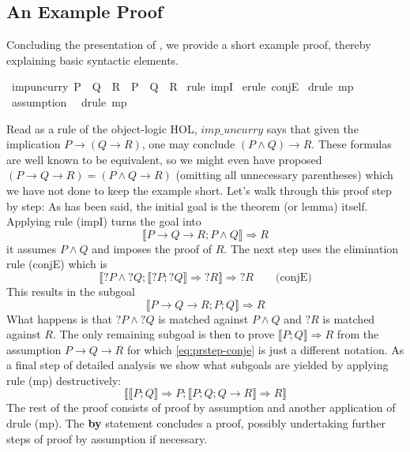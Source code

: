 \subsection{An Example Proof}
\label{sec:an-example-proof}

Concluding the presentation of \Isabelle, we provide a short example proof,
thereby explaining basic syntactic elements. 


\begin{isabellebody}%
\isanewline
\isamarkupfalse%
\ imp{\isacharunderscore}uncurry{\isacharcolon}\ {\isachardoublequote}P\ {\isasymlongrightarrow}\ {\isacharparenleft}Q\ {\isasymlongrightarrow}\ R{\isacharparenright}\ {\isasymLongrightarrow}\ {\isacharparenleft}P\ {\isasymand}\ Q{\isacharparenright}\ {\isasymlongrightarrow}\ R{\isachardoublequote}\isanewline
\isamarkupfalse%
\ {\isacharparenleft}rule\ impI{\isacharparenright}\isanewline
\isamarkupfalse%
\ {\isacharparenleft}erule\ conjE{\isacharparenright}\isanewline
\isamarkupfalse%
\ {\isacharparenleft}drule\ mp{\isacharparenright}\isanewline
\isamarkupfalse%
\ assumption\isanewline
\isamarkupfalse%
\ \ {\isacharparenleft}drule\ mp{\isacharparenright}\isanewline
\end{isabellebody}

Read as a rule of the object-logic HOL, $\mathit{imp\_uncurry}$ says that given
the implication $P \longrightarrow (Q \longrightarrow R)$, one may conclude $(P\land Q) \longrightarrow R$. These formulas are
well known to be equivalent, so we might even have proposed $(P \longrightarrow Q \longrightarrow R) = (P \land
Q \longrightarrow R)$ (omitting all unnecessary parentheses) which we have not done to keep
the example short. Let's walk through this proof
step by step: As has been said, the initial goal is the theorem (or lemma)
itself. Applying rule (impI) turns the goal into
\[
\llbracket P\longrightarrow Q\longrightarrow R; P\land Q\rrbracket \Longrightarrow R
\]
\IE it assumes $P\land Q$ and imposes the proof of $R$. The next step uses the
elimination rule (conjE) which is
\[
\llbracket{?P} \land {?Q}; \llbracket{?P}; {?Q}\rrbracket \Longrightarrow {?R}\rrbracket \Longrightarrow {?R}\qquad \text{(conjE)}
\]
This results in the subgoal
\begin{equation} \label{eq:prstep-conje}
\llbracket P\longrightarrow Q\longrightarrow R; P; Q\rrbracket \Longrightarrow R
\end{equation}
What happens is that ${?P} \land {?Q}$ is matched against $P \land Q$ and ${?R}$ is
matched against $R$. The only remaining subgoal is then to prove $\llbracket P; Q\rrbracket\Longrightarrow R$ from
the assumption $P\longrightarrow Q\longrightarrow R$ for which \eqref{eq:prstep-conje} is just a different
notation. As a final step of detailed analysis we show what subgoals are yielded
by applying rule (mp) destructively:
\[
\llbracket \llbracket P; Q\rrbracket \Longrightarrow P; \llbracket P; Q; Q \longrightarrow R\rrbracket \Longrightarrow R\rrbracket
\] 
The rest of the proof consists of proof by assumption and another application of
drule (mp). The \textbf{by} statement concludes a proof, possibly undertaking
further steps of proof by assumption if necessary.


